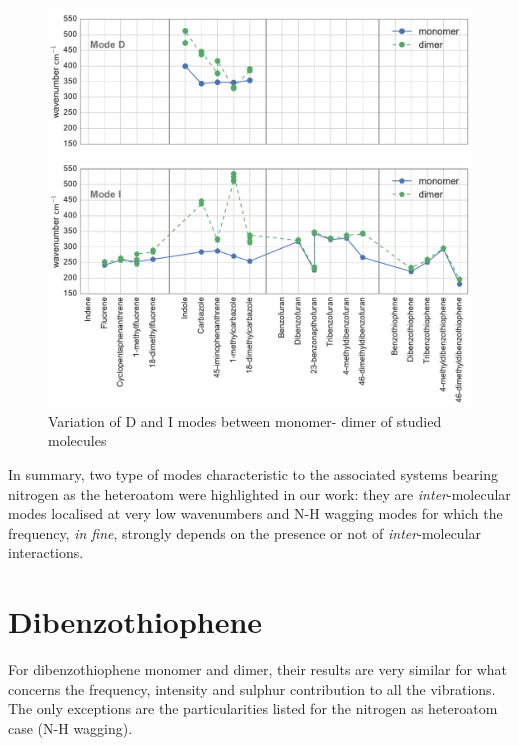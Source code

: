 	
	\begin{figure}[H]
		\begin{center}
			\includegraphics[scale=0.33]{image/P2-12}
		\end{center}
		\caption{Variation of D and I modes between monomer- dimer of studied molecules} \label{figP2-12}
	\end{figure}
	
	
	In summary, two type of modes characteristic to the associated systems bearing nitrogen as the heteroatom were highlighted in our work: they are \textit{inter}-molecular modes localised at very low wavenumbers and N-H wagging modes for which the frequency, \textit{in fine}, strongly depends on the presence or not of \textit{inter}-molecular interactions. 
	
	
	
	\section{Dibenzothiophene}
	
	
	For dibenzothiophene monomer and dimer, their results are very similar for what concerns the frequency, intensity and sulphur contribution to all the vibrations. The only exceptions are the particularities listed for the nitrogen as heteroatom case (N-H wagging).
	
